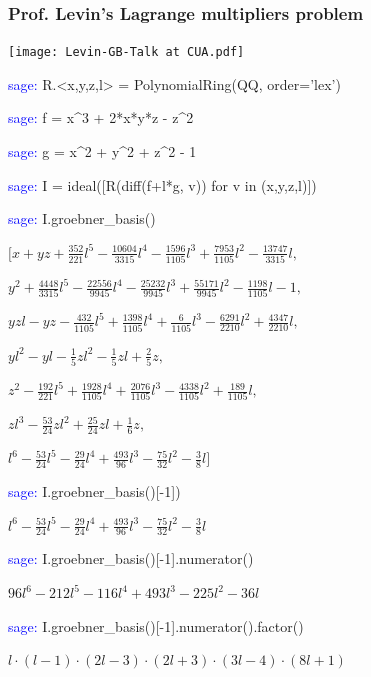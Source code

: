 \documentclass{beamer}
\begin{document}
\begin{frame}
\frametitle{Prof. Levin's Lagrange multipliers problem}
\texttt{[image: Levin-GB-Talk at CUA.pdf]}
\end{frame}

\begin{frame}
\begin{semiverbatim}
\textcolor{blue}{sage:} R.<x,y,z,l> = PolynomialRing(QQ, order='lex')

\textcolor{blue}{sage:} f = x\^{}3 + 2*x*y*z - z\^{}2

\textcolor{blue}{sage:} g = x\^{}2 + y\^{}2 + z\^{}2 - 1

\textcolor{blue}{sage:} I = ideal([R(diff(f+l*g, v)) for v in (x,y,z,l)])

\textcolor{blue}{sage:} I.groebner\_basis()

$[x + y z + \frac{352}{221} l^{5} - \frac{10604}{3315} l^{4} - \frac{1596}{1105} l^{3} + \frac{7953}{1105} l^{2} - \frac{13747}{3315} l,$

$\allowbreak y^{2} + \frac{4448}{3315} l^{5} - \frac{22556}{9945} l^{4} - \frac{25232}{9945} l^{3} + \frac{55171}{9945} l^{2} - \frac{1198}{1105} l - 1,$

$y z l - y z - \frac{432}{1105} l^{5} + \frac{1398}{1105} l^{4} + \frac{6}{1105} l^{3} - \frac{6291}{2210} l^{2} + \frac{4347}{2210} l,$

$y l^{2} - y l - \frac{1}{5} z l^{2} - \frac{1}{5} z l + \frac{2}{5} z,$

$z^{2} - \frac{192}{221} l^{5} + \frac{1928}{1105} l^{4} + \frac{2076}{1105} l^{3} - \frac{4338}{1105} l^{2} + \frac{189}{1105} l,$

$z l^{3} - \frac{53}{24} z l^{2} + \frac{25}{24} z l + \frac{1}{6} z,$

$l^{6} - \frac{53}{24} l^{5} - \frac{29}{24} l^{4} + \frac{493}{96} l^{3} - \frac{75}{32} l^{2} - \frac{3}{8} l]$

\textcolor{blue}{sage:} I.groebner\_basis()[-1])

$l^{6} - \frac{53}{24} l^{5} - \frac{29}{24} l^{4} + \frac{493}{96} l^{3} - \frac{75}{32} l^{2} - \frac{3}{8} l$

\textcolor{blue}{sage:} I.groebner\_basis()[-1].numerator()

$96 l^{6} - 212 l^{5} - 116 l^{4} + 493 l^{3} - 225 l^{2} - 36 l$

\textcolor{blue}{sage:} I.groebner\_basis()[-1].numerator().factor()

$l \cdot (l - 1) \cdot (2 l - 3) \cdot (2 l + 3) \cdot (3 l - 4) \cdot (8 l + 1)$

\end{semiverbatim}
\end{frame}
\end{document}
